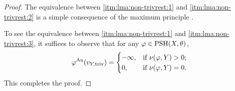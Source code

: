 \begin{proof}
The equivalence between \ref{itm:lma:non-trivrest:1} and \ref{itm:lma:non-trivrest:2} is a simple consequence of the maximum principle \cite[Lemma~1.4(i)]{BJ22}.

To see the equivalence between \ref{itm:lma:non-trivrest:1} and \ref{itm:lma:non-trivrest:3}, it suffices to observe that for any $\varphi\in \mathrm{PSH}(X,\theta)$,
\[
\varphi^{\mathrm{An}}(v_{Y,\mathrm{triv}})=
\begin{cases}
    -\infty,&\textup{if }\nu(\varphi,Y)>0;\\
    0,& \textup{if }\nu(\varphi,Y)=0.
\end{cases}
\]
This completes the proof.
\end{proof}




%
